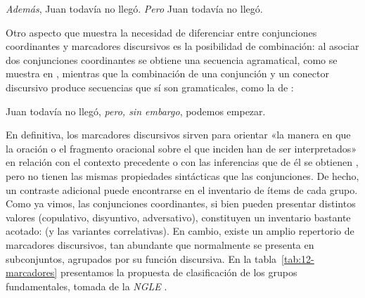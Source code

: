 \begin{exe}
  \ex\label{ex:12-pausa}
    \begin{xlist}
      \ex \textit{Además}, Juan todavía no llegó.
      \ex \textit{Pero} Juan todavía no llegó.
    \end{xlist}
\end{exe}

Otro aspecto que muestra la necesidad de diferenciar entre conjunciones
coordinantes y marcadores discursivos es la posibilidad de combinación: al
asociar dos conjunciones coordinantes se obtiene una secuencia agramatical, como
se muestra en , mientras que la combinación de una conjunción
y un conector discursivo produce secuencias que sí son gramaticales, como la de
:

\begin{exe}
  \ex
    \begin{xlist}
      \ex\label{ex:12-comb-b} Juan todavía no llegó, \textit{pero, sin embargo},
          podemos empezar.
    \end{xlist}
\end{exe}

En definitiva, los marcadores discursivos sirven para orientar «la manera en que
la oración o el fragmento oracional sobre el que inciden han de ser
interpretados» en relación con el contexto precedente o con las inferencias que
de él se obtienen \parencite[§\,30.12i]{rae2025}, pero no tienen las mismas
propiedades sintácticas que las conjunciones. De hecho, un contraste adicional
puede encontrarse en el inventario de ítems de cada grupo. Como ya vimos, las
conjunciones coordinantes, si bien pueden presentar distintos valores
(copulativo, disyuntivo, adversativo), constituyen un inventario bastante
acotado:  (y las variantes correlativas). En cambio,
existe un amplio repertorio de marcadores discursivos, tan abundante que
normalmente se presenta en subconjuntos, agrupados por su función discursiva. En
la tabla~\ref{tab:12-marcadores} presentamos la propuesta de clasificación de
los grupos fundamentales, tomada de la \textit{NGLE}
\parencite[§\,30.13a]{rae2025}.

